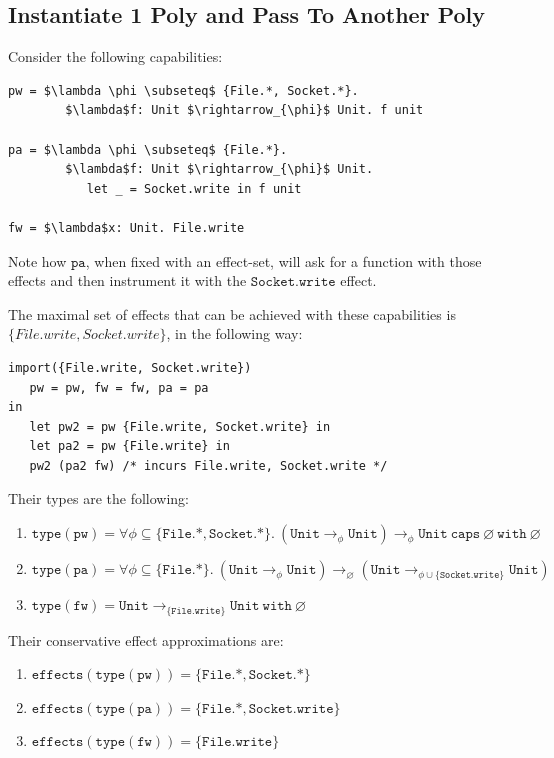 \documentclass{llncs}
\newcommand{\keywadj}[1]{\mathtt{#1}}
\newcommand{\kwa}[1]{\keywadj{ #1 }}
\begin{document}
\subsection{Instantiate 1 Poly and Pass To Another Poly}

Consider the following capabilities:

\begin{lstlisting}
pw = $\lambda \phi \subseteq$ {File.*, Socket.*}.
        $\lambda$f: Unit $\rightarrow_{\phi}$ Unit. f unit

pa = $\lambda \phi \subseteq$ {File.*}.
        $\lambda$f: Unit $\rightarrow_{\phi}$ Unit.
           let _ = Socket.write in f unit

fw = $\lambda$x: Unit. File.write
\end{lstlisting}

\noindent
Note how $\kwa{pa}$, when fixed with an effect-set, will ask for a function with those effects and then instrument it with the $\kwa{Socket.write}$ effect.

The maximal set of effects that can be achieved with these capabilities is $\{ File.write, Socket.write \}$, in the following way:

\begin{lstlisting}
import({File.write, Socket.write})
   pw = pw, fw = fw, pa = pa
in
   let pw2 = pw {File.write, Socket.write} in
   let pa2 = pw {File.write} in
   pw2 (pa2 fw) /* incurs File.write, Socket.write */
\end{lstlisting}

\noindent
Their types are the following:

\begin{enumerate}
	\item $\kwa{type(pw) = \forall \phi \subseteq \{ File.*, Socket.* \}.~(Unit \rightarrow_{\phi} Unit) \rightarrow_{\phi} Unit~caps~\varnothing~with~\varnothing}$ 
	\item $\kwa{type(pa) = \forall \phi \subseteq \{ File.* \}.~(Unit \rightarrow_{\phi} Unit) \rightarrow_{\varnothing} (Unit \rightarrow_{\phi \cup \{Socket.write\}} Unit)}$
	\item $\kwa{type(fw) = Unit \rightarrow_{\{File.write\}} Unit~with~\varnothing}$
\end{enumerate}

\noindent
Their conservative effect approximations are:

\begin{enumerate}
	\item $\kwa{effects(type(pw)) = \{File.*, Socket.* \} }$
	\item $\kwa{effects(type(pa)) = \{File.*, Socket.write \}}$
	\item $\kwa{effects(type(fw)) = \{File.write\} }$
\end{enumerate}
\end{document}
